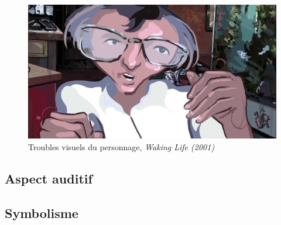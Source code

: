 \documentclass[../main.tex]{subfile}
\begin{document}
\begin{figure}
    \centering
    \includegraphics[width=\linewidth]{images/trouble2}
    \caption{Troubles visuels du personnage, \emph{Waking Life (2001)}}
    \label{fig:images_trouble2}
\end{figure}

\subsection{Aspect auditif}

\subsection{Symbolisme}
\end{document}
